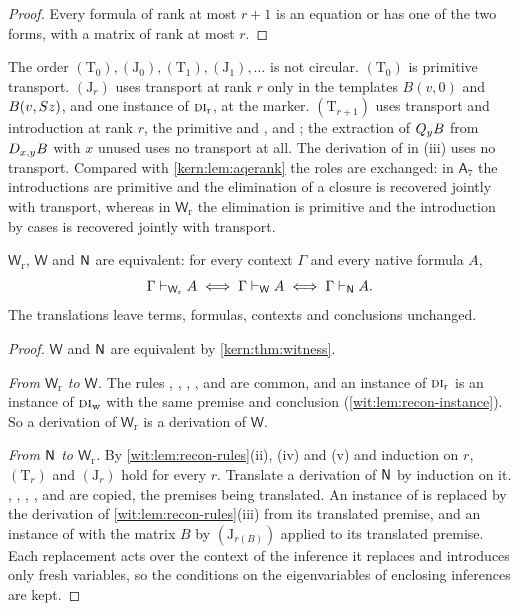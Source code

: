 \begin{proof}
Every formula of rank at most $r+1$ is an equation or has one of the two
forms, with a matrix of rank at most $r$.
\end{proof}

The order $(\mathrm T_0),(\mathrm J_0),(\mathrm T_1),(\mathrm J_1),\dots$ is
not circular.  $(\mathrm T_0)$ is primitive transport.  $(\mathrm J_r)$ uses
transport at rank $r$ only in the templates $B(v,0)$ and $B(v,S z)$, and
one instance of $\rulename{DI}_{\mathrm{r}}$, at the marker.
$(\mathrm T_{r+1})$ uses transport and introduction at rank $r$, the primitive
 and , and ; the extraction of
$Q_{y}B$ from $D_{x,y}B$ with $x$ unused uses no transport at all.  The
derivation of  in (iii) uses no transport.  Compared with
\cref{kern:lem:aqerank} the roles are exchanged: in $\mathsf{A}_7$ the
introductions are primitive and the elimination of a closure is recovered
jointly with transport, whereas in $\mathsf{W}_{\mathrm r}$ the elimination is
primitive and the introduction by cases is recovered jointly with transport.

\begin{theorem}
\label{wit:thm:recon}
$\mathsf{W}_{\mathrm r}$, $\mathsf{W}$ and $\mathsf{N}$ are equivalent: for every
context $\Gamma$ and every native formula $A$,
\[
 \Gamma\vdash_{\mathsf{W}_{\mathrm r}}A
 \iff\Gamma\vdash_{\mathsf{W}}A
 \iff\Gamma\vdash_{\mathsf{N}}A .
\]
The translations leave terms, formulas, contexts and conclusions unchanged.
\end{theorem}

\begin{proof}
$\mathsf{W}$ and $\mathsf{N}$ are equivalent by \cref{kern:thm:witness}.

\emph{From $\mathsf{W}_{\mathrm r}$ to $\mathsf{W}$.}  The rules ,
, , ,  and 
are common, and an instance of $\rulename{DI}_{\mathrm{r}}$ is an instance of
$\rulename{DI}_{\mathrm{w}}$ with the same premise and conclusion
(\cref{wit:lem:recon-instance}).  So a derivation of
$\mathsf{W}_{\mathrm r}$ is a derivation of $\mathsf{W}$.

\emph{From $\mathsf{N}$ to $\mathsf{W}_{\mathrm r}$.}  By
\cref{wit:lem:recon-rules}(ii), (iv) and (v) and induction on $r$,
$(\mathrm T_r)$ and $(\mathrm J_r)$ hold for every $r$.  Translate a
derivation of $\mathsf{N}$ by induction on it.  , ,
, ,  and  are copied, the
premises being translated.  An instance of  is replaced by the
derivation of \cref{wit:lem:recon-rules}(iii) from its translated premise, and
an instance of  with the matrix $B$ by $(\mathrm J_{r(B)})$
applied to its translated premise.  Each replacement acts over the context of
the inference it replaces and introduces only fresh variables, so the
conditions on the eigenvariables of enclosing inferences are kept.
\end{proof}

